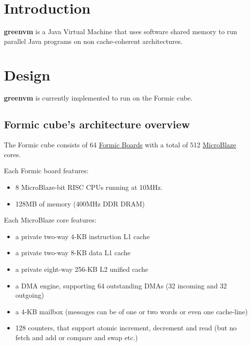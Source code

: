 \documentclass[
a4paper,
12pt,
]{report}
\newcommand{\gvm}{{\fontfamily{fco}\selectfont\textbf{\color{g}green\color{v}vm}}\xspace}
\newcommand{\mblaze}{MicroBlaze\texttrademark\xspace}
\newcommand{\java}{Java\texttrademark\xspace}
\begin{document}
\pagestyle{plain}
\listoftodos
\newpage
\tableofcontents
\newpage
\thispagestyle{empty}
\pagestyle{headings}

\chapter*{Introduction}

\gvm is a \java Virtual Machine that uses software shared memory to run
parallel \java programs on non cache-coherent architectures.

\chapter{Design}

\gvm is currently implemented to run on the Formic cube.

\section{Formic cube's architecture overview}

The Formic cube consists of 64
\href{http://www.formic-board.com/}{Formic Boards} with a total of 512
\href{http://www.xilinx.com/tools/microblaze.htm}{\mblaze} cores.

Each Formic board features:
\begin{itemize}
\item 8 \mblaze 32-bit RISC CPUs running at 10MHz.
\item 128MB of memory (400MHz DDR DRAM)
\end{itemize}

Each \mblaze core features:
\begin{itemize}
\item a private two-way 4-KB instruction L1 cache
\item a private two-way 8-KB data L1 cache
\item a private eight-way 256-KB L2 unified cache
\item a DMA engine, supporting 64 outstanding DMAs (32 incoming and 32 outgoing)
\item a 4-KB mailbox (messages can be of one or two words or even one cache-line)
\item 128 counters, that support atomic increment, decrement and read
  (but no fetch and add or compare and swap etc.)
\end{itemize}
\end{document}
